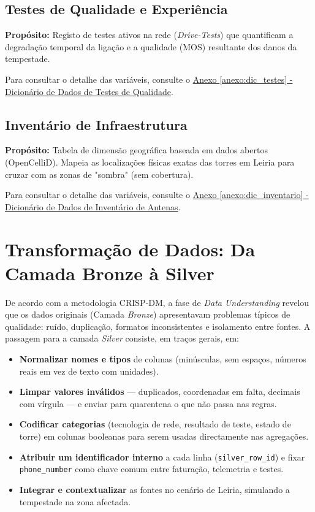 \documentclass[runningheads]{llncs}
\begin{document}
\newpage


\subsection{Testes de Qualidade e Experiência}
\textbf{Propósito:} Registo de testes ativos na rede (\textit{Drive-Tests}) que quantificam a degradação temporal da ligação e a qualidade (MOS) resultante dos danos da tempestade.

Para consultar o detalhe das variáveis, consulte o \hyperref[anexo:dic_testes]{Anexo \ref*{anexo:dic_testes} - Dicionário de Dados de Testes de Qualidade}.


\subsection{Inventário de Infraestrutura}
\textbf{Propósito:} Tabela de dimensão geográfica baseada em dados abertos (OpenCelliD). Mapeia as localizações físicas exatas das torres em Leiria para cruzar com as zonas de "sombra" (sem cobertura).

Para consultar o detalhe das variáveis, consulte o \hyperref[anexo:dic_inventario]{Anexo \ref*{anexo:dic_inventario} - Dicionário de Dados de Inventário de Antenas}.



\section{Transformação de Dados: Da Camada Bronze à Silver}

De acordo com a metodologia CRISP-DM, a fase de \textit{Data Understanding} revelou que os dados originais (Camada \textit{Bronze}) apresentavam problemas típicos de qualidade: ruído, duplicação, formatos inconsistentes e isolamento entre fontes. A passagem para a camada \textit{Silver} consiste, em traços gerais, em:

\begin{itemize}
    \item \textbf{Normalizar nomes e tipos} de colunas (minúsculas, sem espaços, números reais em vez de texto com unidades).
    \item \textbf{Limpar valores inválidos} --- duplicados, coordenadas em falta, decimais com vírgula --- e enviar para quarentena o que não passa nas regras.
    \item \textbf{Codificar categorias} (tecnologia de rede, resultado de teste, estado de torre) em colunas booleanas para serem usadas directamente nas agregações.
    \item \textbf{Atribuir um identificador interno} a cada linha (\texttt{silver\_row\_id}) e fixar \texttt{phone\_number} como chave comum entre faturação, telemetria e testes.
    \item \textbf{Integrar e contextualizar} as fontes no cenário de Leiria, simulando a tempestade na zona afectada.
\end{itemize}
\end{document}
